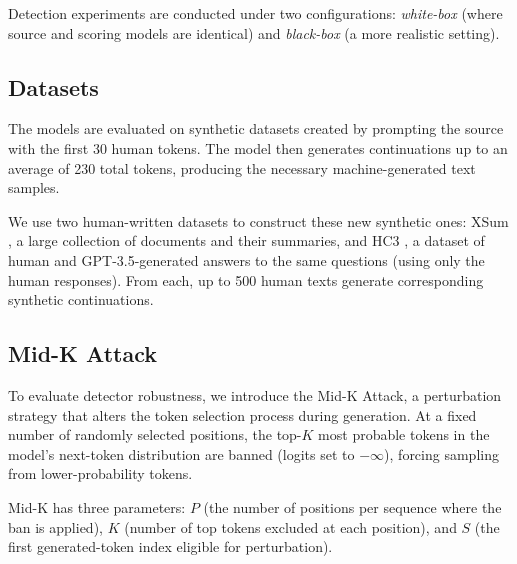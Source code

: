\documentclass[11pt]{article}
\begin{document}
Detection experiments are conducted under two configurations:
\textit{white-box} (where source and scoring models are identical) and \textit{black-box} (a more realistic setting). %

\subsection{Datasets}

The models are evaluated on synthetic datasets created by prompting the source with the first 30 human tokens. The model then generates continuations up to an average of 230 total tokens, producing the necessary machine-generated text samples.

We use two human-written datasets to construct these new synthetic ones:
XSum \cite{XSum}, a large collection of documents and their summaries, and HC3 \cite{HC3}, a dataset of human and GPT-3.5-generated answers to the same questions (using only the human responses). From each, up to 500 human texts generate corresponding synthetic continuations.

\subsection{Mid-K Attack}

To evaluate detector robustness, we introduce the Mid-K Attack, a perturbation strategy that alters the token selection process during generation. At a fixed number of randomly selected positions, the top-$K$ most probable tokens in the model’s next-token distribution are banned (logits set to $-\infty$), forcing sampling from lower-probability tokens.

Mid-K has three parameters: $P$ (the number of positions per sequence where the ban is applied), $K$ (number of top tokens excluded at each position), and $S$ (the first generated-token index eligible for perturbation).
\end{document}
